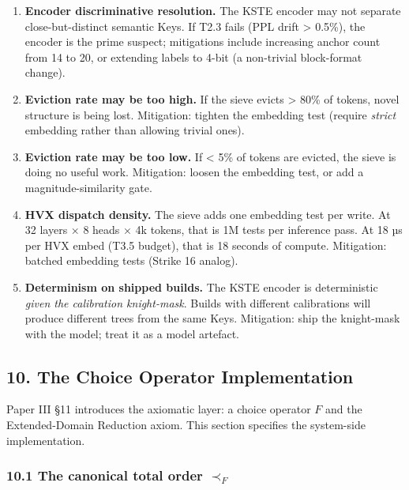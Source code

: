 \documentclass[
  11pt,
]{article}
\begin{document}
\begin{enumerate}
\def\labelenumi{\arabic{enumi}.}
\item
  \textbf{Encoder discriminative resolution.} The KSTE encoder may not
  separate close-but-distinct semantic Keys. If T2.3 fails (PPL drift
  \textgreater{} 0.5\%), the encoder is the prime suspect; mitigations
  include increasing anchor count from 14 to 20, or extending labels to
  4-bit (a non-trivial block-format change).
\item
  \textbf{Eviction rate may be too high.} If the sieve evicts
  \textgreater{} 80\% of tokens, novel structure is being lost.
  Mitigation: tighten the embedding test (require \emph{strict}
  embedding rather than allowing trivial ones).
\item
  \textbf{Eviction rate may be too low.} If \textless{} 5\% of tokens
  are evicted, the sieve is doing no useful work. Mitigation: loosen the
  embedding test, or add a magnitude-similarity gate.
\item
  \textbf{HVX dispatch density.} The sieve adds one embedding test per
  write. At 32 layers × 8 heads × 4k tokens, that is 1M tests per
  inference pass. At 18 µs per HVX embed (T3.5 budget), that is 18
  seconds of compute. Mitigation: batched embedding tests (Strike 16
  analog).
\item
  \textbf{Determinism on shipped builds.} The KSTE encoder is
  deterministic \emph{given the calibration knight-mask}. Builds with
  different calibrations will produce different trees from the same
  Keys. Mitigation: ship the knight-mask with the model; treat it as a
  model artefact.
\end{enumerate}

\hypertarget{the-choice-operator-implementation}{%
\subsection{10. The Choice Operator
Implementation}\label{the-choice-operator-implementation}}

Paper III §11 introduces the axiomatic layer: a choice operator \(F\)
and the Extended-Domain Reduction axiom. This section specifies the
system-side implementation.

\hypertarget{the-canonical-total-order-prec_f}{%
\subsubsection{\texorpdfstring{10.1 The canonical total order
\(\prec_F\)}{10.1 The canonical total order \textbackslash prec\_F}}\label{the-canonical-total-order-prec_f}}
\end{document}
